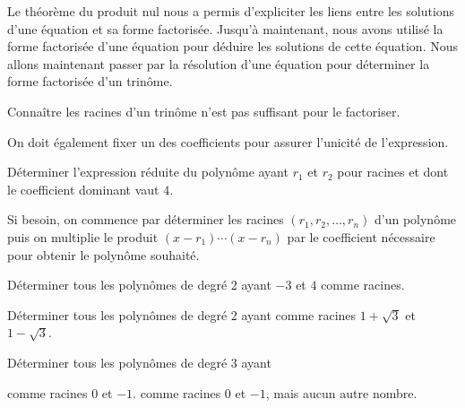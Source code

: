 \documentclass[a4paper,12pt]{report}
\begin{document}
Le théorème du produit nul nous a permis d'expliciter les liens entre les solutions d'une équation et sa forme factorisée.
Jusqu'à maintenant, nous avons utilisé la forme factorisée d'une équation pour déduire les solutions de cette équation.
Nous allons maintenant passer par la résolution d'une équation pour déterminer la forme factorisée d'un trinôme. 
\begin{boiteExT}[Rappels]
	\vspace{7cm}

\end{boiteExT}
Connaître les racines d'un trinôme n'est pas suffisant pour le factoriser.
\begin{boiteExT}
	\vspace{4.5cm}

\end{boiteExT}
On doit également fixer un des coefficients pour assurer l'unicité de l'expression.

Déterminer l'expression réduite du polynôme ayant $r_1$ et $r_2$ pour racines et dont le coefficient dominant vaut $4$.
\begin{boiteExT}

	\vspace{5cm}	

\end{boiteExT}
Si besoin, on commence par déterminer les racines $(r_1, r_2, \ldots, r_n)$ d'un polynôme puis on multiplie le produit $(x-r_1)\cdots (x-r_n)$ par le coefficient nécessaire pour obtenir le polynôme souhaité. 
\begin{boiteExT}[Factoriser $2x^2-3x+1$]
	\vspace{8cm}
\end{boiteExT}
\begin{exo}
	Déterminer tous les polynômes de degré 2 ayant $-3$ et $4$ comme racines.
\end{exo}
\begin{exo}
	Déterminer tous les polynômes de degré 2 ayant comme racines $1+\sqrt{3}$ et $1-\sqrt{3}$.
\end{exo}
\begin{exo}
	Déterminer tous les polynômes de degré 3 ayant
\begin{tasks}
	\task comme racines $0$ et $-1$.
	\task comme racines $0$ et $-1$, mais aucun autre nombre.
\end{tasks}
\end{exo}
\end{document}
